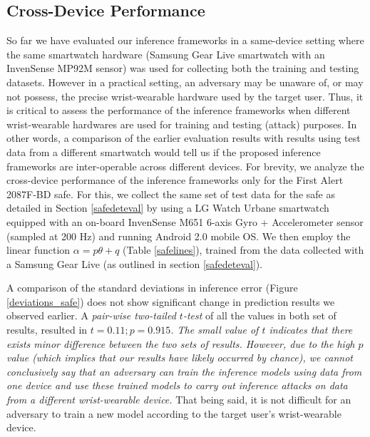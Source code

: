 \documentclass[]{IEEEtran}
\begin{document}
\subsection{Cross-Device Performance}
\label{eval:controlledcrossdevice}
So far we have evaluated our inference frameworks in a same-device setting where the same smartwatch hardware (Samsung Gear Live smartwatch with an InvenSense MP92M sensor) was used for collecting both the training and testing datasets. However in a practical setting, an adversary may be unaware of, or may not possess, the precise wrist-wearable hardware used by the target user. Thus, it is critical to assess the performance of the inference frameworks when different wrist-wearable hardwares are used for training and testing (attack) purposes. In other words, a comparison of the earlier evaluation results with results using test data from a different smartwatch would tell us if the proposed inference frameworks are inter-operable across different devices. For brevity, we analyze the cross-device performance of the inference frameworks only for the First Alert 2087F-BD safe. 
For this, we collect the same set of test data for the safe as detailed in Section \ref{safedeteval} by using a LG Watch Urbane smartwatch equipped with an on-board InvenSense M651 6-axis Gyro + Accelerometer sensor (sampled at 200 Hz) and running Android 2.0 mobile OS. We then employ the linear function $\alpha=p\theta+q$ (Table \ref{safelines}), trained from the data collected with a Samsung Gear Live (as outlined in section \ref{safedeteval}). 

A comparison of the standard deviations in inference error (Figure \ref{deviations_safe}) does not show significant change in prediction results we observed earlier. A \emph{pair-wise two-tailed $t$-test} \cite{zimmerman1997teacher} of all the values in both set of results, resulted in \emph{$t=0.11;p=0.915$. The small value of $t$ indicates that there exists minor difference between the two sets of results. However, due to the high $p$ value (which implies that our results have likely occurred by chance), we cannot conclusively say that an adversary can train the inference models using data from one device and use these trained models to carry out inference attacks on data from a different wrist-wearable device.} That being said, it is not difficult for an adversary to train a new model according to the target user's wrist-wearable device.
\end{document}
